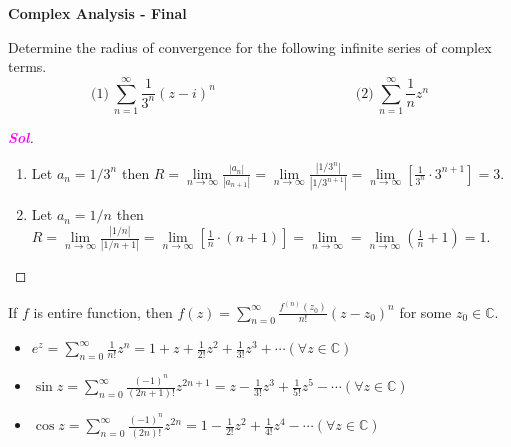 \documentclass{article}
\theoremstyle{definition}
\newcommand{\C}{\mathbb{C}}
\newcommand{\of}[1]{\left( #1 \right)}
\newcommand{\abs}[1]{\left\lvert #1 \right\rvert}
\newcommand{\sol}{\textcolor{magenta}{\bf Sol}}
\begin{document}
\begin{center}
	\huge\textbf{Complex Analysis - Final}\\
	\vspace{0.5em}
\end{center}

\begin{tcolorbox}[colback=white,colframe=white,arc=5pt,title={\color{black}\bf $\bullet$ Radius of Convergence}]
	Determine the radius of convergence for the following infinite series of complex terms. \[
	\text{(1)}\ \sum_{n=1}^{\infty}\frac{1}{3^n}(z-i)^n\quad\quad\quad\quad\quad\quad\quad\quad\quad\quad
	\text{(2)}\ \sum_{n=1}^{\infty}\frac{1}{n}z^n
	\]
\end{tcolorbox}
\begin{proof}[\sol]
	\begin{enumerate}[(1)]
		\item Let $a_n=1/3^n$ then $\displaystyle
		R=\lim\limits_{n\to\infty}\frac{\abs{a_n}}{\abs{a_{n+1}}}=\lim\limits_{n\to\infty}\frac{\abs{1/3^n}}{\abs{1/3^{n+1}}}=\lim\limits_{n\to\infty}\left[\frac{1}{3^n}\cdot 3^{n+1}\right]=3.$
		\item Let $a_n=1/n$ then $\displaystyle
		R=\lim\limits_{n\to\infty}\frac{\abs{1/n}}{\abs{1/n+1}}=\lim\limits_{n\to\infty}\left[\frac{1}{n}\cdot (n+1)\right]=\lim\limits_{n\to\infty}=\lim\limits_{n\to\infty}\of{\frac{1}{n}+1}=1.$
	\end{enumerate}
\end{proof}
\begin{tcolorbox}[colback=white,colframe=black,arc=5pt,title={\color{white}\bf Taylor Series}]
	If $f$ is entire function, then $\displaystyle
	f(z)=\sum_{n=0}^{\infty}\frac{f^{(n)}(z_0)}{n!}(z-z_0)^n
	$ for some $z_0\in\C$.
\end{tcolorbox}
\begin{tcolorbox}[colback=white,colframe=black,arc=5pt,title={\color{white}\bf Maclaurin's Series}]
	\begin{itemize}
		\item $\displaystyle e^z=\sum_{n=0}^{\infty}\frac{1}{n!}z^n=1+z+\frac{1}{2!}z^2+\frac{1}{3!}z^3+\cdots$\quad $(\forall z\in\C)$
		\item $\displaystyle
		\sin z=\sum_{n=0}^{\infty}\frac{(-1)^n}{(2n+1)!}z^{2n+1}=z-\frac{1}{3!}z^3+\frac{1}{5!}z^5-\cdots$\quad $(\forall z\in\C)$
		\item $\displaystyle
		\cos z=\sum_{n=0}^{\infty}\frac{(-1)^n}{(2n)!}z^{2n}=1-\frac{1}{2!}z^2+\frac{1}{4!}z^4-\cdots$\quad $(\forall z\in\C)$
	\end{itemize}
\end{tcolorbox}
\end{document}
